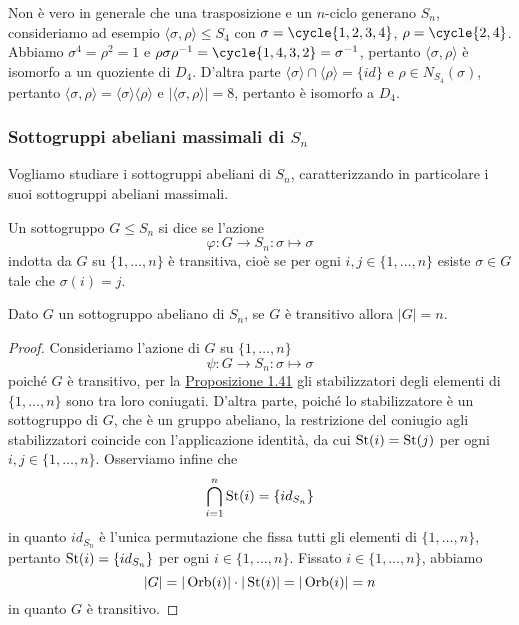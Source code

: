\documentclass[11pt]{scrartcl}
\begin{document}
\begin{remark}
    Non è vero in generale che una trasposizione e un $n$-ciclo generano $S_n$,
    consideriamo ad esempio $\langle\sigma, \rho\rangle\leqslant S_4$ con
    $\sigma = \cycle{1, 2, 3, 4}$, $\rho = \cycle{2, 4}$. Abbiamo
    $\sigma^4 = \rho^2 = 1$ e $\rho\sigma\rho^{-1} = \cycle{1, 4, 3, 2} =
    \sigma^{-1}$, pertanto $\langle\sigma, \rho\rangle$ è isomorfo a un 
    quoziente di $D_4$. D'altra parte $\langle\sigma\rangle\cap \langle\rho\rangle = \{id\}$
    e $\rho \in N_{S_4}(\sigma)$, pertanto $\langle\sigma, \rho\rangle =
    \langle\sigma\rangle\langle\rho\rangle$ e $|\langle\sigma, \rho\rangle| = 8$,
    pertanto è isomorfo a $D_4$. 
\end{remark}

\subsubsection{Sottogruppi abeliani massimali di $S_n$}

Vogliamo studiare i sottogruppi abeliani di $S_n$, caratterizzando in particolare
i suoi sottogruppi abeliani massimali.

\begin{definition}
    Un sottogruppo $G\leqslant S_n$ si dice  se l'azione
    \[
        \varphi: G\longrightarrow S_n :\sigma \longmapsto \sigma
    \]indotta da $G$ su $\{1, \ldots, n\}$ è transitiva, cioè se per ogni
    $i, j \in \{1, \ldots, n\}$ esiste $\sigma \in G$ tale che $\sigma(i) = j$.
\end{definition}

\begin{lemma}
    \label{lemma3.0}
    Dato $G$ un sottogruppo abeliano di $S_n$, se $G$ è transitivo allora $|G| = n$.
\end{lemma}

\begin{proof}
    Consideriamo l'azione di $G$ su $\{1, \ldots, n\}$
    \[
        \psi : G\longrightarrow S_n :\sigma \longmapsto \sigma
    \]
    poiché $G$ è transitivo, per la \hyperref[prop1.0]{Proposizione 1.41}
    gli stabilizzatori degli elementi di $\{1, \ldots, n\}$ sono tra loro coniugati.
    D'altra parte, poiché lo stabilizzatore è un sottogruppo di $G$, che
    è un gruppo abeliano, la restrizione del coniugio agli
    stabilizzatori coincide con l'applicazione identità, da cui $\operatorname{St}(i) = \operatorname{St}(j)$
    per ogni $i, j \in \{1, \ldots, n\}$. Osserviamo infine che 
    \[
        \bigcap_{i = 1}^n \operatorname{St}(i) = \{id_{S_n}\}
    \]in quanto $id_{S_n}$ è l'unica permutazione che fissa tutti gli elementi
    di $\{1, \ldots, n\}$, pertanto $\operatorname{St}(i) = \{id_{S_n}\}$ per ogni $i \in \{1, \ldots, n\}$.
    Fissato $i \in \{1, \ldots, n\}$, abbiamo 
    \[
        |G| = |\operatorname{Orb}(i)|\cdot|\operatorname{St}(i)| = |\operatorname{Orb}(i)| = n
    \]
    in quanto $G$ è transitivo.
\end{proof}
\end{document}

